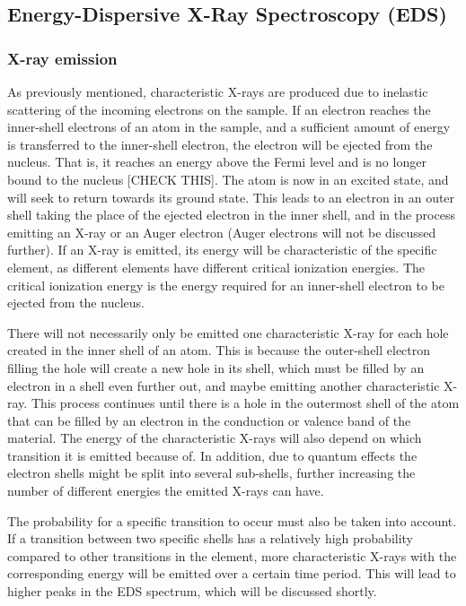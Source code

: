 	\subsection{Energy-Dispersive X-Ray Spectroscopy (EDS)} %
		\subsubsection{X-ray emission}
As previously mentioned, characteristic X-rays are produced due to inelastic scattering of the incoming electrons on the sample. If an electron reaches the inner-shell electrons of an atom in the sample, and a sufficient amount of energy is transferred to the inner-shell electron, the electron will be ejected from the nucleus. That is, it reaches an energy above the Fermi level and is no longer bound to the nucleus [CHECK THIS]. The atom is now in an excited state, and will seek to return towards its ground state. This leads to an electron in an outer shell taking the place of the ejected electron in the inner shell, and in the process emitting an X-ray or an Auger electron (Auger electrons will not be discussed further). If an X-ray is emitted, its energy will be characteristic of the specific element, as different elements have different critical ionization energies. The critical ionization energy is the energy required for an inner-shell electron to be ejected from the nucleus.

There will not necessarily only be emitted one characteristic X-ray for each hole created in the inner shell of an atom. This is because the outer-shell electron filling the hole will create a new hole in its shell, which must be filled by an electron in a shell even further out, and maybe emitting another characteristic X-ray. This process continues until there is a hole in the outermost shell of the atom that can be filled by an electron in the conduction or valence band of the material. The energy of the characteristic X-rays will also depend on which transition it is emitted because of. In addition, due to quantum effects the electron shells might be split into several sub-shells, further increasing the number of different energies the emitted X-rays can have.

The probability for a specific transition to occur must also be taken into account. If a transition between two specific shells has a relatively high probability compared to other transitions in the element, more characteristic X-rays with the corresponding energy will be emitted over a certain time period. This will lead to higher peaks in the EDS spectrum, which will be discussed shortly.

